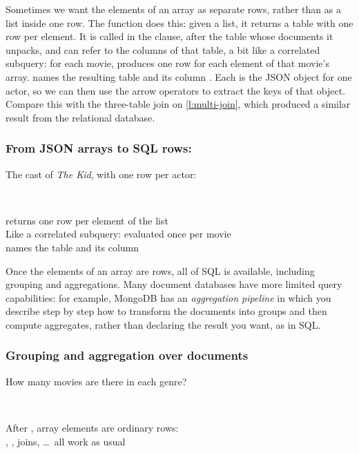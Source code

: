 Sometimes we want the elements of an array as separate rows, rather than as a list inside one row.
The function  does this: given a list, it returns a table with one row per element.
It is called in the  clause, after the table whose documents it unpacks, and can refer to the columns of that table, a bit like a correlated subquery: for each movie,  produces one row for each element of that movie's  array.
 names the resulting table  and its column .
Each  is the JSON object for one actor, so we can then use the arrow operators to extract the keys of that object.
Compare this with the three-table join on \autoref{l:multi-join}, which produced a similar result from the relational database.

\begin{frame}
    \label{s:json-unnest}
    \frametitle{From JSON arrays to SQL rows: }
    The cast of \emph{The Kid}, with one row per actor:
    \inputminted[fontsize=\footnotesize]{sql}{code/json-unnest.sql}
    \vspace{0.3em}
    {\footnotesize}\\[0.8em]
     returns one row per element of the list\\[0.4em]
    Like a correlated subquery: evaluated once per movie\\[0.4em]
     names the table  and its column 
\end{frame}
\label{l:json-unnest}

Once the elements of an array are rows, all of SQL is available, including grouping and aggregations.
Many document databases have more limited query capabilities: for example, MongoDB has an \emph{aggregation pipeline} in which you describe step by step how to transform the documents into groups and then compute aggregates, rather than declaring the result you want, as in SQL.

\begin{frame}
    \label{s:json-group}
    \frametitle{Grouping and aggregation over documents}
    How many movies are there in each genre?
    \inputminted[fontsize=\footnotesize]{sql}{code/json-group.sql}
    \vspace{0.3em}
    {\footnotesize}\\[0.8em]
    After , array elements are ordinary rows:\\
    , , joins, \dots\ all work as usual
\end{frame}
\label{l:json-group}

